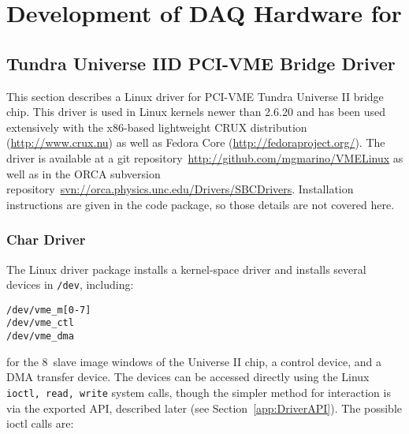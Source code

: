 
\chapter{Development of DAQ Hardware for \MJ}
\label{app:ORCASoftwareChapter}

	\section{Tundra Universe IID PCI-VME Bridge Driver}
	\label{sec:TundraUniverse}

This section describes a Linux driver for PCI-VME Tundra Universe II bridge chip.  This
driver is used in Linux kernels newer than 2.6.20 and has been used extensively
with the x86-based lightweight CRUX distribution (\url{http://www.crux.nu}) as
well as Fedora Core (\url{http://fedoraproject.org/}).  The driver is available
at a git repository~\url{http://github.com/mgmarino/VMELinux} as well as in the ORCA subversion
repository~\url{svn://orca.physics.unc.edu/Drivers/SBCDrivers}.  Installation instructions
are given in the code package, so those details are not covered here.

		\subsection{Char Driver}

The Linux driver package installs a kernel-space driver and installs several devices in 
\lstinline!/dev!, including:
		\begin{lstlisting}
/dev/vme_m[0-7]
/dev/vme_ctl
/dev/vme_dma
		\end{lstlisting}
for the 8~slave image windows of the Universe II chip, a control device, and a DMA transfer device.  The devices can be accessed directly using the Linux \lstinline!ioctl, read, write! 
system calls, though the simpler method for interaction is via the exported API, described later (see Section~\ref{app:DriverAPI}).  The possible ioctl calls are:


